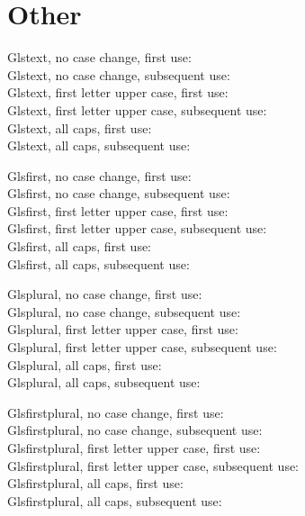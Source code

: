 \documentclass[10pt]{uit-thesis-test}
\begin{document}
\section{Other}
Glstext, no case change, first use: \\
Glstext, no case change, subsequent use: \\
Glstext, first letter upper case, first use: \\
Glstext, first letter upper case, subsequent use: \\
Glstext, all caps, first use: \\
Glstext, all caps, subsequent use: 

Glsfirst, no case change, first use: \\
Glsfirst, no case change, subsequent use: \\
Glsfirst, first letter upper case, first use: \\
Glsfirst, first letter upper case, subsequent use: \\
Glsfirst, all caps, first use: \\
Glsfirst, all caps, subsequent use: 

Glsplural, no case change, first use: \\
Glsplural, no case change, subsequent use: \\
Glsplural, first letter upper case, first use: \\
Glsplural, first letter upper case, subsequent use: \\
Glsplural, all caps, first use: \\
Glsplural, all caps, subsequent use: 

Glsfirstplural, no case change, first use: \\
Glsfirstplural, no case change, subsequent use: \\
Glsfirstplural, first letter upper case, first use: \\
Glsfirstplural, first letter upper case, subsequent use: \\
Glsfirstplural, all caps, first use: \\
Glsfirstplural, all caps, subsequent use: 
\end{document}
